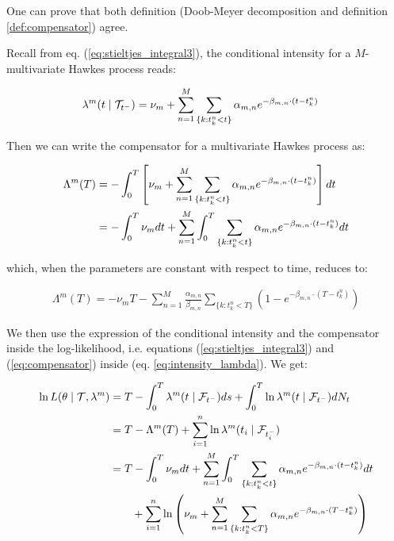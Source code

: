 \documentclass[11pt]{book}
\begin{document}
One can prove that both definition (Doob-Meyer decomposition and definition \ref{def:compensator}) agree.

Recall from eq. (\ref{eq:stieltjes_integral3}), the conditional intensity for a $M$-multivariate Hawkes process reads:

\begin{align}
\lambda^{m} (t \mid \mathcal{T}_{t^-} ) &= 
\nu_m + \sum_{n = 1}^M \sum_{ \{k: t_k^n < t \}} \alpha_{m,n} e^{- \beta_{m,n} \cdot ( t - t_k^n ) } 
\end{align}


Then we can write the compensator for a multivariate Hawkes process as:

\begin{align}
\Lambda^{m}(T) &= - \int_0^T \left [ \nu_m + \sum_{n = 1}^M \sum_{ \{k: t_k^n < t \}} \alpha_{m,n} e^{- \beta_{m,n} \cdot ( t - t_k^n ) } \right ] dt \notag \\
&=  - \int_0^T \nu_m dt  + \sum_{n = 1}^M  \int_0^T \sum_{ \{k: t_k^n < t \}} \alpha_{m,n} e^{- \beta_{m,n} \cdot ( t - t_k^n ) } dt
\label{eq:compensator}
\end{align}

which, when the parameters are constant with respect to time, reduces to:

\begin{align}
\Lambda^{m}(T) = - \nu_m T  - \sum_{n = 1}^M  \frac{\alpha_{m,n}}{ \beta_{m,n} } \sum_{ \{k: t_k^n < T \}} \left ( 1 - e^{- \beta_{m,n} \cdot ( T - t_k^n ) }  \right ) 
\label{eq:compensator_constant}
\end{align}

We then use the expression of the conditional intensity and the compensator inside the log-likelihood, i.e. equations (\ref{eq:stieltjes_integral3}) and (\ref{eq:compensator}) inside (eq. \ref{eq:intensity_lambda}). We get:


\begin{align}
\ln L( \theta \mid \mathcal{T}, \lambda^{m} ) &=  T - \int_0^T \lambda^m(t \mid \mathcal F_{t^-}) ds + \int_0^T  \ln \lambda^{m}(t \mid \mathcal F_{t^-} )d N_t  \notag \\
&= T - \Lambda^{m}(T) + \sum_{i=1}^n  \ln \lambda^{m}(t_i \mid \mathcal F_{t_i^-} ) \notag \\
&= 
T - \int_0^T \nu_m dt  + \sum_{n = 1}^M  \int_0^T \sum_{ \{k: t_k^n < t \}}  \alpha_{m,n} e^{- \beta_{m,n} \cdot ( t - t_k^n ) } dt \notag
\\ &  \qquad + \sum_{i=1}^n  \ln \left ( 
\nu_m + \sum_{n = 1}^M \sum_{ \{k: t_k^n < T \}} \alpha_{m,n} e^{- \beta_{m,n} \cdot ( T - t_k^n ) }
\right ) 
\end{align}
\end{document}
